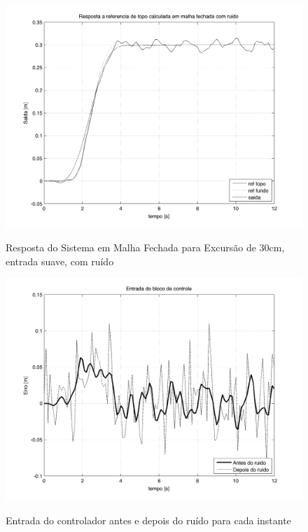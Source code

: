 \begin{figure}[!htb]
    \centering
    \begin{minipage}{.45\textwidth}
        \centering
        
        \includegraphics[width=1\linewidth]{figs/resultados/simulacao/respostaMalhaAbertaRefTopoRuido}
        \label{respostaMalhaAbertaRefTopoRuido}
        \caption{Resposta do Sistema em Malha Fechada para Excursão de 30cm, entrada suave, com ruído}
    \end{minipage}%
    \hspace{0.1cm}
    \begin{minipage}{0.45\textwidth}
        \centering
               \includegraphics[width=1\linewidth]{figs/resultados/simulacao/entradaControladorYERR}
        \label{entradaControladorYERR}
        \caption{Entrada do controlador antes e depois do ruído para cada instante}

    \end{minipage}
\end{figure}


